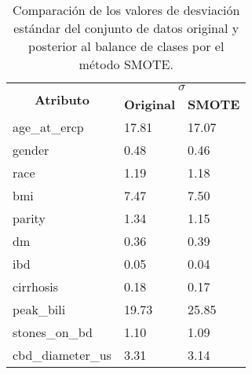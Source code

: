 \begin{table}[!htb]
\centering
\caption{Comparación de los valores de desviación estándar del conjunto de datos original y posterior al balance de clases por el método SMOTE.}
\label{Tab: SMOTE-std}
\begin{tabular}{|l|ll|}
\hline
\multicolumn{1}{|c|}{\multirow{2}{*}{\textbf{Atributo}}} & \multicolumn{2}{c|}{\textbf{$\sigma$}}                                           \\ \cline{2-3} 
\multicolumn{1}{|c|}{}                                   & \multicolumn{1}{c|}{\textbf{Original}} & \multicolumn{1}{c|}{\textbf{SMOTE}} \\ \hline
age\_at\_ercp                                            & \multicolumn{1}{l|}{17.81}             & 17.07                                \\ \hline
gender                                                   & \multicolumn{1}{l|}{0.48}              & 0.46                                 \\ \hline
race                                                     & \multicolumn{1}{l|}{1.19}              & 1.18                                 \\ \hline
bmi                                                      & \multicolumn{1}{l|}{7.47}              & 7.50                                 \\ \hline
parity                                                   & \multicolumn{1}{l|}{1.34}              & 1.15                                 \\ \hline
dm                                                       & \multicolumn{1}{l|}{0.36}              & 0.39                                 \\ \hline
ibd                                                      & \multicolumn{1}{l|}{0.05}              & 0.04                                 \\ \hline
cirrhosis                                                & \multicolumn{1}{l|}{0.18}              & 0.17                                 \\ \hline
peak\_bili                                               & \multicolumn{1}{l|}{19.73}             & 25.85                                \\ \hline
stones\_on\_bd                                           & \multicolumn{1}{l|}{1.10}              & 1.09                                 \\ \hline
cbd\_diameter\_us                                        & \multicolumn{1}{l|}{3.31}              & 3.14                                 \\ \hline

\end{tabular}
\end{table}
